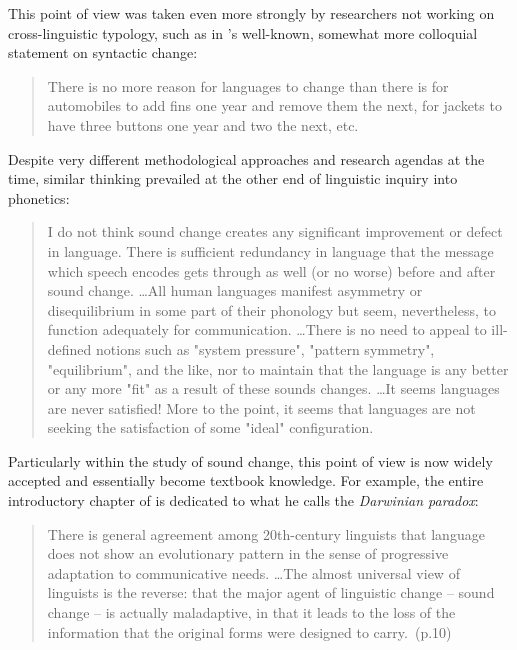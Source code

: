 This point of view was taken even more strongly by researchers not working on cross-linguistic typology, such as in \citeauthor{Postal1968}'s well-known, somewhat more colloquial statement on syntactic change:

\begin{quote}
There is no more reason for languages to change than there is for automobiles to add fins one year and remove them the next, for jackets to have three buttons one year and two the next, etc.~\citep[p.283]{Postal1968}
\end{quote}

Despite very different methodological approaches and research agendas at the time, similar thinking prevailed at the other end of linguistic inquiry into phonetics:

\begin{quote}
I do not think sound change creates any significant improvement or defect in language. There is sufficient redundancy in language that the message which speech encodes gets through as well (or no worse) before and after sound change. \ldots All human languages manifest asymmetry or disequilibrium in some part of their phonology but seem, nevertheless, to function adequately for communication. \ldots There is no need to appeal to ill-defined notions such as "system pressure", "pattern symmetry", "equilibrium", and the like, nor to maintain that the language is any better or any more "fit" as a result of these sounds changes. \ldots It seems languages are never satisfied! More to the point, it seems that languages are not seeking the satisfaction of some "ideal" configuration.~\citep[p.191-192]{Ohala1989}
\end{quote}

Particularly within the study of sound change, this point of view is now widely accepted and essentially become textbook knowledge. For example, the entire introductory chapter of \citet{Labov2001} is dedicated to what he calls the \emph{Darwinian paradox}: 

\begin{quote}
There is general agreement among 20th-century linguists that language does not show an evolutionary pattern in the sense of progressive adaptation to communicative needs. \ldots The almost universal view of linguists is the reverse: that the major agent of linguistic change -- sound change -- is actually maladaptive, in that it leads to the loss of the information that the original forms were designed to carry.~(p.10)
\end{quote}

